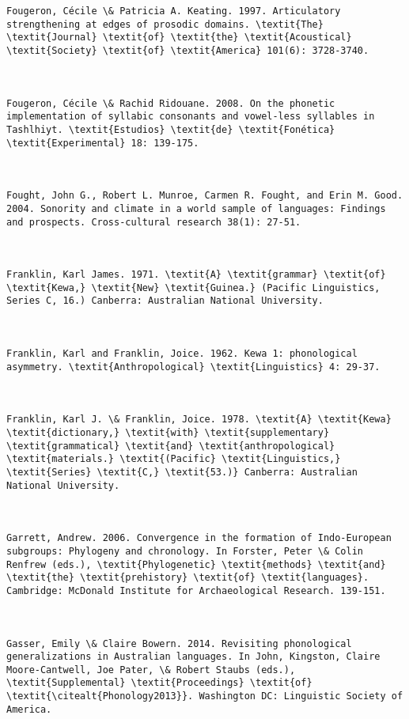\begin{verbatim}
Fougeron, Cécile \& Patricia A. Keating. 1997. Articulatory strengthening at edges of prosodic domains. \textit{The} \textit{Journal} \textit{of} \textit{the} \textit{Acoustical} \textit{Society} \textit{of} \textit{America} 101(6): 3728-3740.



Fougeron, Cécile \& Rachid Ridouane. 2008. On the phonetic implementation of syllabic consonants and vowel-less syllables in Tashlhiyt. \textit{Estudios} \textit{de} \textit{Fonética} \textit{Experimental} 18: 139-175.



Fought, John G., Robert L. Munroe, Carmen R. Fought, and Erin M. Good. 2004. Sonority and climate in a world sample of languages: Findings and prospects. Cross-cultural research 38(1): 27-51.



Franklin, Karl James. 1971. \textit{A} \textit{grammar} \textit{of} \textit{Kewa,} \textit{New} \textit{Guinea.} (Pacific Linguistics, Series C, 16.) Canberra: Australian National University.



Franklin, Karl and Franklin, Joice. 1962. Kewa 1: phonological asymmetry. \textit{Anthropological} \textit{Linguistics} 4: 29-37.



Franklin, Karl J. \& Franklin, Joice. 1978. \textit{A} \textit{Kewa} \textit{dictionary,} \textit{with} \textit{supplementary} \textit{grammatical} \textit{and} \textit{anthropological} \textit{materials.} \textit{(Pacific} \textit{Linguistics,} \textit{Series} \textit{C,} \textit{53.)} Canberra: Australian National University.



Garrett, Andrew. 2006. Convergence in the formation of Indo-European subgroups: Phylogeny and chronology. In Forster, Peter \& Colin Renfrew (eds.), \textit{Phylogenetic} \textit{methods} \textit{and} \textit{the} \textit{prehistory} \textit{of} \textit{languages}. Cambridge: McDonald Institute for Archaeological Research. 139-151.



Gasser, Emily \& Claire Bowern. 2014. Revisiting phonological generalizations in Australian languages. In John, Kingston, Claire Moore-Cantwell, Joe Pater, \& Robert Staubs (eds.), \textit{Supplemental} \textit{Proceedings} \textit{of} \textit{\citealt{Phonology2013}}. Washington DC: Linguistic Society of America.




\end{verbatim}
